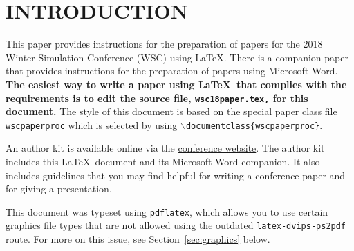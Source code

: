 \documentclass{wscpaperproc}
\theoremstyle{wsc}
\begin{document}
\section{INTRODUCTION}
\label{sec:intro}

This paper provides instructions for the preparation of papers for the 2018
Winter Simulation Conference (WSC) using \LaTeX. There is a companion paper that
provides instructions for the preparation of papers using Microsoft Word. \textbf{The easiest way to write a paper using \LaTeX\ that complies with the
requirements is to edit the source file, {\tt wsc18paper.tex,} for this document.}
The style of this document is based on the special paper class file {\tt wscpaperproc} which is selected by using {\tt $\backslash$documentclass\{wscpaperproc\}}.

An author kit is available online via the  \href{http://www.wintersim.org}%
{conference website}.
The author kit includes this \LaTeX\ document and its Microsoft Word companion.
It also includes guidelines that you may find helpful for writing a conference paper and for giving a presentation.

This document was typeset using {\tt pdflatex}, which allows you to use certain
graphics file types that are not allowed using the outdated {\tt latex-dvips-ps2pdf} route.
For more on this issue, see Section~\ref{sec:graphics} below.
\end{document}
